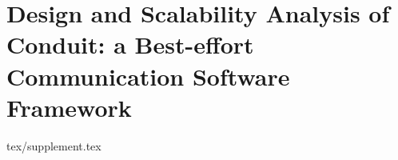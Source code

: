 \chapter{Design and Scalability Analysis of Conduit: a Best-effort Communication Software Framework}
\label{ch:conduit-appendix}

{tex/supplement.tex}
